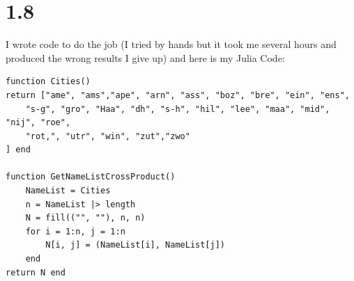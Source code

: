 \documentclass[]{article}
\theoremstyle{definition}
\begin{document}
\section{1.8}
    I wrote code to do the job (I tried by hands but it took me several hours and produced the wrong results I give up) and here is my Julia Code: 
    \begin{lstlisting}
function Cities()
return ["ame", "ams","ape", "arn", "ass", "boz", "bre", "ein", "ens", 
    "s-g", "gro", "Haa", "dh", "s-h", "hil", "lee", "maa", "mid", "nij", "roe",
    "rot,", "utr", "win", "zut","zwo"
] end

function GetNameListCrossProduct()
    NameList = Cities
    n = NameList |> length
    N = fill(("", ""), n, n)
    for i = 1:n, j = 1:n
        N[i, j] = (NameList[i], NameList[j])
    end
return N end


\end{lstlisting}
\end{document}
